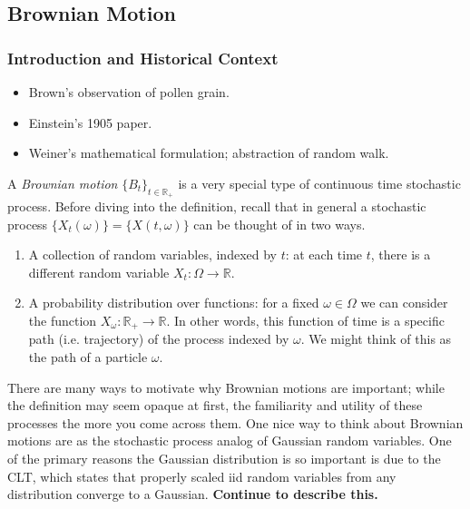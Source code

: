\documentclass[12pt]{article}
\newcommand{\R}{\mathbb{R}}
\begin{document}
\subsection{Brownian Motion}

\subsubsection{Introduction and Historical Context}
\begin{itemize}
\item Brown's observation of pollen grain. 
\item Einstein's 1905 paper. 
\item Weiner's mathematical formulation; abstraction of random walk. 
\end{itemize}



A \textit{Brownian motion} $\{B_t\}_{t \in \R_+}$ is a very special type of continuous time stochastic process. Before diving into the definition, recall that in general a stochastic process 
$\{X_t(\omega)\} = \{X(t, \omega)\}$ can be thought of in two ways. 
\begin{enumerate}
\item A collection of random variables, indexed by $t$: at each time $t$, there is a different random variable $X_t: \Omega \to \R$. 
\item A probability distribution over functions: for a fixed $\omega \in \Omega$ we can consider the function $X_\omega: \R_+ \to \R$. In other words, this function of time is 
a specific path (i.e. trajectory) of the process indexed by $\omega$. We might think of this as the path of a particle $\omega$. 
\end{enumerate}

There are many ways to motivate why Brownian motions are important; while the definition may seem opaque at first, the familiarity and utility of these processes the more you come across them. 
One nice way to think about Brownian motions are as the stochastic process analog of Gaussian random variables. One of the primary reasons the Gaussian distribution is so important is due to 
the CLT, which states that properly scaled iid random variables from any distribution converge to a Gaussian. \textbf{Continue to describe this.}
\end{document}
